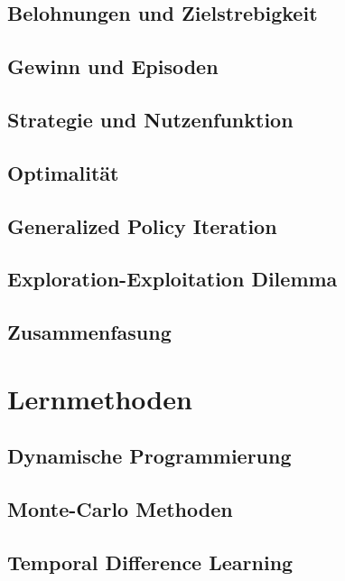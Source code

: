 \documentclass[12pt]{scrartcl}
\numberwithin{equation}{section}
\begin{document}
	\subsection{Belohnungen und Zielstrebigkeit}
	

	\subsection{Gewinn und Episoden}
	

	\subsection{Strategie und Nutzenfunktion}
	

	\subsection{Optimalität} \label{sec:optimality}
	

	\subsection{Generalized Policy Iteration}
	

	\subsection{Exploration-Exploitation Dilemma}
	

	\subsection{Zusammenfasung}
	

\section{Lernmethoden}
	\subsection{Dynamische Programmierung}
	
	\subsection{Monte-Carlo Methoden}
	
	\subsection{Temporal Difference Learning}
	
\end{document}
